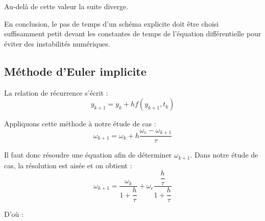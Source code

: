 \documentclass[10pt]{article}
\begin{document}
Au-delà de  cette valeur la suite diverge.

En conclusion, le pas de temps d’un schéma explicite doit être choisi suffisamment petit devant les constantes de temps de l’équation différentielle pour éviter des instabilités numériques.

\subsection{Méthode d'Euler implicite}
\begin{resultat}
La relation de récurrence s’écrit : 
$$y_{k+1}=y_k+hf(y_{k+1},t_k)$$
\end{resultat}

Appliquons cette méthode à notre étude de cas :
$$\omega_{{k+1}}=\omega_{k}+h \dfrac{\omega_c-\omega_{{k+1}}}{\tau}$$

Il faut donc résoudre une équation afin de déterminer $\omega_{{k+1}}$. Dans notre étude de cas, la résolution est aisée et on obtient :
$$\omega_{{k+1}}=\dfrac{\omega_{k}}{1+\dfrac{h}{\tau}}+\omega_c \dfrac{\dfrac{h}{\tau}}{1+\dfrac{h}{\tau}}$$

D’où :
\end{document}
